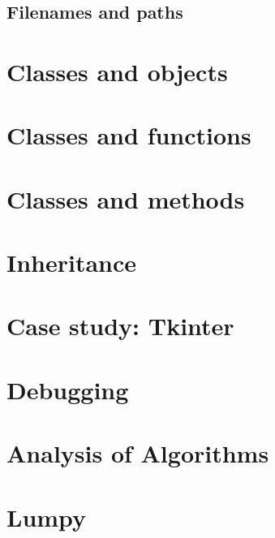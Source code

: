 \documentclass{article}
\begin{document}
\subsection{Filenames and paths}

\newpage%
\section{Classes and objects}
\newpage%
\section{Classes and functions}
\newpage%
\section{Classes and methods}
\newpage%
\section{Inheritance}
\newpage%
\section{Case study: Tkinter}
\newpage%
\section{Debugging}
\newpage%
\section{Analysis of Algorithms}
\newpage%
\section{Lumpy}
\end{document}
